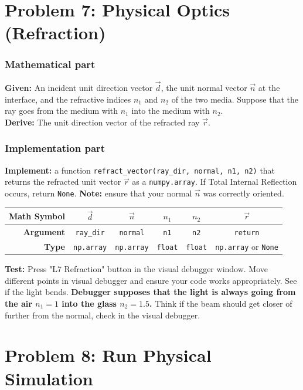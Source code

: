\documentclass[11pt]{article}
\begin{document}
\section*{Problem 7: Physical Optics (Refraction)}

\subsubsection*{Mathematical part}
\textbf{Given:} An incident unit direction vector $\vec{d}$, the unit normal vector $\vec{n}$ at the interface, and the refractive indices $n_1$ and $n_2$ of the two media. Suppose that the ray goes from the medium with $n_1$ into the medium with $n_2$. \\
\textbf{Derive:} The unit direction vector of the refracted ray $\vec{r}$.

\subsubsection*{Implementation part}
\textbf{Implement:} a function \lstinline|refract_vector(ray_dir, normal, n1, n2)| that returns the refracted unit vector $\vec{r}$ as a \lstinline|numpy.array|. If Total Internal Reflection occurs, return \lstinline|None|. \textbf{Note:} ensure that your normal $\vec{n}$ was correctly oriented.
\begin{center}
\renewcommand{\arraystretch}{2.0}
\begin{tabular}{r | c | c | c | c | c}
\toprule
\textbf{Math Symbol} & $\vec{d}$ & $\vec{n}$ & $n_1$ & $n_2$ & $\vec{r}$ \\
\midrule
\textbf{Argument} & \lstinline|ray_dir| & \lstinline|normal| & \lstinline|n1| & \lstinline|n2| & \lstinline|return| \\
\midrule
\textbf{Type} & \lstinline|np.array| & \lstinline|np.array| & \lstinline|float| & \lstinline|float| & \lstinline|np.array| or \lstinline|None| \\
\bottomrule
\end{tabular}
\end{center}
\textbf{Test:} Press "L7 Refraction" button in the visual debugger window. Move different points in visual debugger and ensure your code works appropriately. See if the light bends. \textbf{Debugger supposes that the light is always going from the air $n_1 = 1$ into the glass $n_2 = 1.5$.} Think if the beam should get closer of further from the normal, check in the visual debugger.


\section*{Problem 8: Run Physical Simulation}
\end{document}
